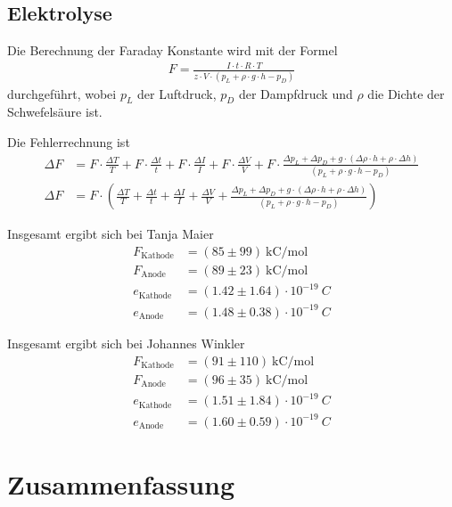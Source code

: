 \documentclass{article}
\begin{document}
\subsection{Elektrolyse}


Die Berechnung der Faraday Konstante wird mit der Formel
\begin{align}
F = \frac{I\cdot t\cdot R \cdot T}{z \cdot V \cdot (p_L +\rho \cdot g \cdot h - p_D)}
\end{align}
durchgeführt, wobei $p_L$ der Luftdruck, $p_D$ der Dampfdruck und $\rho$ die Dichte der Schwefelsäure ist.

Die Fehlerrechnung ist
\begin{align*}
\Delta F &= F\cdot \frac{\Delta T}{T} + F\cdot \frac{\Delta t}{t} + F\cdot \frac{\Delta I}{I} + F \cdot \frac{\Delta V}{V}  + F\cdot \frac{\Delta p_L + \Delta p_D + g\cdot (\Delta\rho \cdot h + \rho\cdot \Delta h)}{(p_L +\rho \cdot g \cdot h - p_D)}\\
\Delta F &= F\cdot \left(\frac{\Delta T}{T} + \frac{\Delta t}{t} + \frac{\Delta I}{I} + \frac{\Delta V}{V}  + \frac{\Delta p_L + \Delta p_D + g\cdot (\Delta\rho \cdot h + \rho\cdot \Delta h)}{(p_L +\rho \cdot g \cdot h - p_D)}\right)
\end{align*}


Insgesamt ergibt sich bei Tanja Maier
\begin{align*}
F_\text{Kathode} &= (85 \pm 99)~\text{kC/mol}\\
F_\text{Anode} &= (89 \pm 23)~\text{kC/mol} \\
e_\text{Kathode} &= (1.42 \pm 1.64)\cdot 10^{-19}~C \\
e_\text{Anode} &= (1.48 \pm 0.38)\cdot 10^{-19}~C  
\end{align*}

Insgesamt ergibt sich bei Johannes Winkler
\begin{align*}
F_\text{Kathode} &= (91 \pm 110)~\text{kC/mol}\\
F_\text{Anode} &= (96 \pm 35)~\text{kC/mol} \\
e_\text{Kathode} &= (1.51 \pm 1.84)\cdot 10^{-19}~C \\
e_\text{Anode} &= (1.60 \pm 0.59)\cdot 10^{-19}~C  
\end{align*}


\section{Zusammenfassung}
\end{document}
